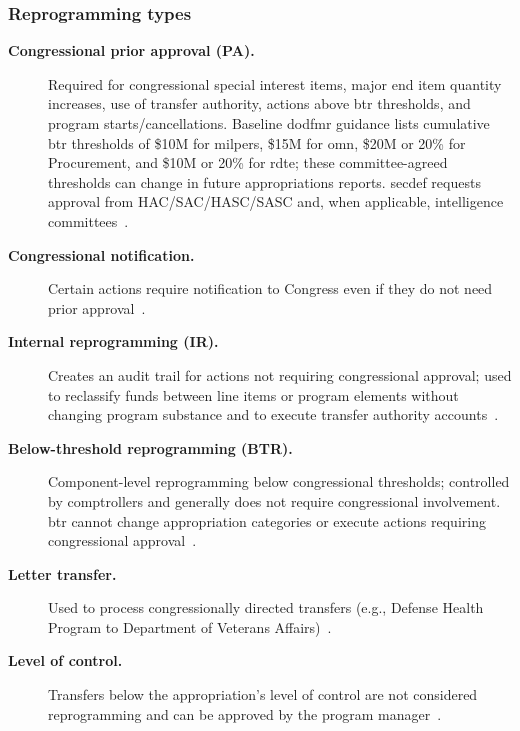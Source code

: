 \documentclass[../main.tex]{subfiles}
\begin{document}
\subsubsection{Reprogramming types}
\begin{description}
  \item[\textbf{Congressional prior approval (PA).}] Required for congressional special interest items, major end item quantity increases, use of transfer authority, actions above \ac{btr} thresholds, and program starts/cancellations. Baseline \ac{dodfmr} guidance lists cumulative \ac{btr} thresholds of \$10M for \ac{milpers}, \$15M for \ac{omn}, \$20M or 20\% for Procurement, and \$10M or 20\% for \ac{rdte}; these committee-agreed thresholds can change in future appropriations reports. \ac{secdef} requests approval from HAC/SAC/HASC/SASC and, when applicable, intelligence committees~\autocite{edo-3-1-4-budget-execution-2025,DoDFMR-Vol3-Ch6}.
  \item[\textbf{Congressional notification.}] Certain actions require notification to Congress even if they do not need prior approval~\autocite{edo-3-1-4-budget-execution-2025}.
  \item[\textbf{Internal reprogramming (IR).}] Creates an audit trail for actions not requiring congressional approval; used to reclassify funds between line items or program elements without changing program substance and to execute transfer authority accounts~\autocite{edo-3-1-4-budget-execution-2025}.
  \item[\textbf{Below-threshold reprogramming (BTR).}] Component-level reprogramming below congressional thresholds; controlled by comptrollers and generally does not require congressional involvement. \ac{btr} cannot change appropriation categories or execute actions requiring congressional approval~\autocite{edo-3-1-4-budget-execution-2025}.
  \item[\textbf{Letter transfer.}] Used to process congressionally directed transfers (e.g., Defense Health Program to Department of Veterans Affairs)~\autocite{edo-3-1-4-budget-execution-2025}.
  \item[\textbf{Level of control.}] Transfers below the appropriation's level of control are not considered reprogramming and can be approved by the program manager~\autocite{edo-3-1-4-budget-execution-2025}.
\end{description}

\end{document}
